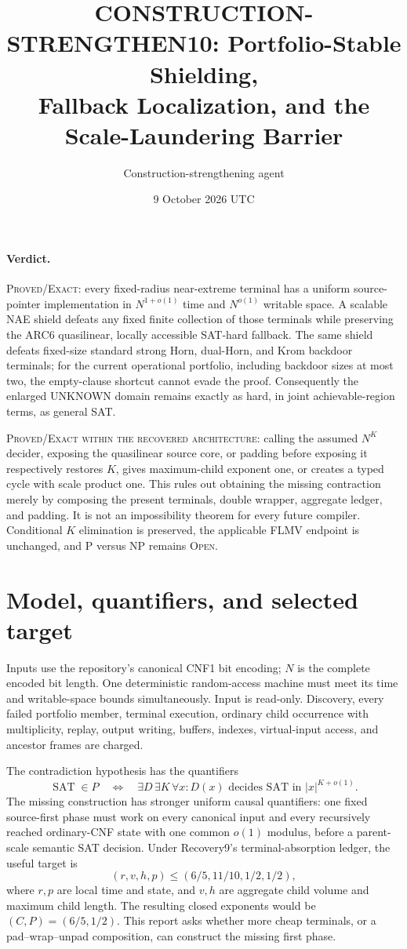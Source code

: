 \documentclass[11pt]{article}
\title{CONSTRUCTION-STRENGTHEN10: Portfolio-Stable Shielding,\\Fallback Localization, and the Scale-Laundering Barrier}
\author{Construction-strengthening agent}
\date{9 October 2026 UTC}
\newcommand{\SAT}{\operatorname{SAT}}
\begin{document}
\sloppy\maketitle

\paragraph{Verdict.}
\textsc{Proved/Exact}: every fixed-radius near-extreme terminal has a
uniform source-pointer implementation in $N^{1+o(1)}$ time and
$N^{o(1)}$ writable space.  A scalable NAE shield defeats any fixed finite
collection of those terminals while preserving the ARC6 quasilinear,
locally accessible SAT-hard fallback.  The same shield defeats fixed-size
standard strong Horn, dual-Horn, and Krom backdoor terminals; for the current
operational portfolio, including backdoor sizes at most two, the empty-clause
shortcut cannot evade the proof.  Consequently the enlarged UNKNOWN domain
remains exactly as hard, in joint achievable-region terms, as general SAT.

\textsc{Proved/Exact within the recovered architecture}: calling the assumed
$N^K$ decider, exposing the quasilinear source core, or padding before
exposing it respectively restores $K$, gives maximum-child exponent one, or
creates a typed cycle with scale product one.  This rules out obtaining the
missing contraction merely by composing the present terminals, double
wrapper, aggregate ledger, and padding.  It is not an impossibility theorem
for every future compiler.  Conditional $K$ elimination is preserved, the
applicable FLMV endpoint is unchanged, and P versus NP remains
\textsc{Open}.

\section{Model, quantifiers, and selected target}

Inputs use the repository's canonical CNF1 bit encoding; $N$ is the complete
encoded bit length.  One deterministic random-access machine must meet its
time and writable-space bounds simultaneously.  Input is read-only.
Discovery, every failed portfolio member, terminal execution, ordinary child
occurrence with multiplicity, replay, output writing, buffers, indexes,
virtual-input access, and ancestor frames are charged.

The contradiction hypothesis has the quantifiers
\[
 \SAT\in P
 \quad\Longleftrightarrow\quad
 \exists D\,\exists K\,\forall x:
 D(x)\text{ decides SAT in }|x|^{K+o(1)}.
\]
The missing construction has stronger uniform causal quantifiers: one fixed
source-first phase must work on every canonical input and every recursively
reached ordinary-CNF state with one common $o(1)$ modulus, before a
parent-scale semantic SAT decision.  Under Recovery9's terminal-absorption
ledger, the useful target is
\[
 (r,v,h,p)\le(6/5,11/10,1/2,1/2),                 \tag{1}
\]
where $r,p$ are local time and state, and $v,h$ are aggregate child volume
and maximum child length.  The resulting closed exponents would be
$(C,P)=(6/5,1/2)$.  This report asks whether more cheap terminals, or a
pad--wrap--unpad composition, can construct the missing first phase.
\end{document}
